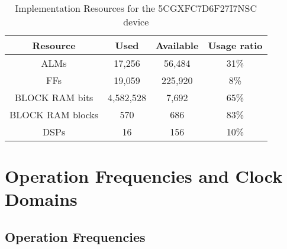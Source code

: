 \documentclass{rep}
\theoremstyle{plain}
\begin{document}
\begin{table}[H]
  \begin{center}
    \begin{tabular}{|c|c|c|c|}
      \hline

      \rowcolor{iob-green}
      \textbf{Resource}  & \textbf{Used} & \textbf{Available} & \textbf{Usage ratio}\\
      \hline
      \hline

      ALMs & 17,256 & 56,484 & 31\%\\
      \hline

      \rowcolor{iob-blue}
      FFs & 19,059  & 225,920 & 8\%\\
      \hline

      BLOCK RAM bits & 4,582,528 & 7,692 & 65\%\\
      \hline

      BLOCK RAM blocks & 570 & 686 & 83\%\\
      \hline

      \rowcolor{iob-blue}
      DSPs & 16 & 156 & 10\%\\
      \hline
      
    \end{tabular}
    \caption{Implementation Resources for the 5CGXFC7D6F27I7NSC device}
    \label{tab:res}
  \end{center}
\end{table}
\clearpage

\section{Operation Frequencies and Clock Domains}

\subsection{Operation Frequencies}
\end{document}
